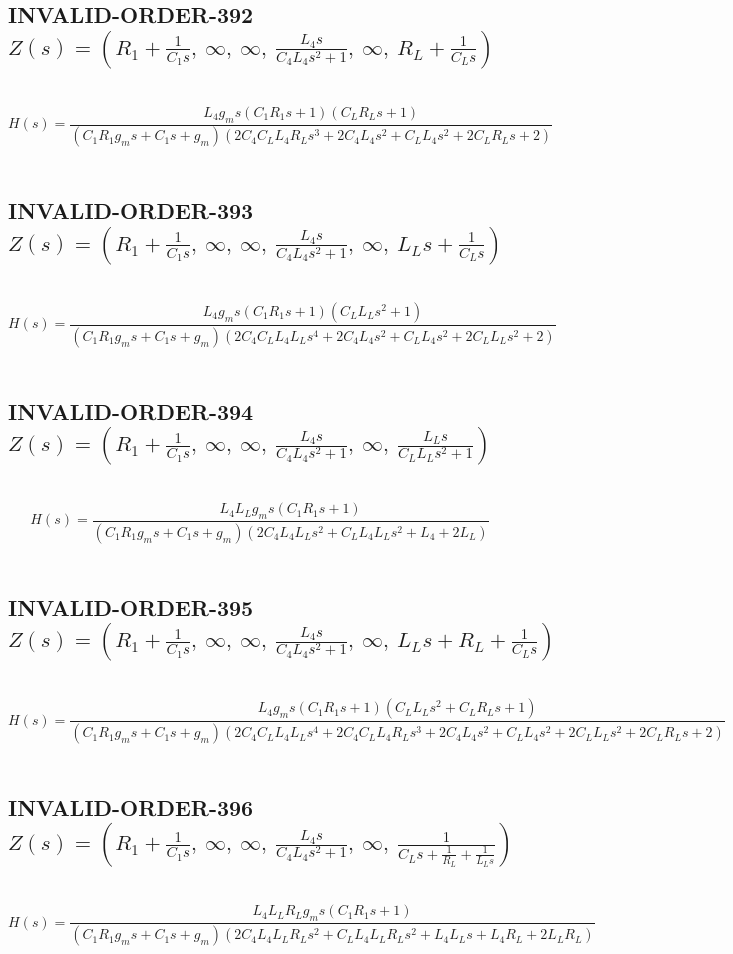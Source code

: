 \documentclass{article}
\begin{document}
\subsection{INVALID-ORDER-392 $Z(s) = \left( R_{1} + \frac{1}{C_{1} s}, \  \infty, \  \infty, \  \frac{L_{4} s}{C_{4} L_{4} s^{2} + 1}, \  \infty, \  R_{L} + \frac{1}{C_{L} s}\right)$ } \ 
\textbf{\[H(s) = \frac{L_{4} g_{m} s \left(C_{1} R_{1} s + 1\right) \left(C_{L} R_{L} s + 1\right)}{\left(C_{1} R_{1} g_{m} s + C_{1} s + g_{m}\right) \left(2 C_{4} C_{L} L_{4} R_{L} s^{3} + 2 C_{4} L_{4} s^{2} + C_{L} L_{4} s^{2} + 2 C_{L} R_{L} s + 2\right)}\] } \ 
\subsection{INVALID-ORDER-393 $Z(s) = \left( R_{1} + \frac{1}{C_{1} s}, \  \infty, \  \infty, \  \frac{L_{4} s}{C_{4} L_{4} s^{2} + 1}, \  \infty, \  L_{L} s + \frac{1}{C_{L} s}\right)$ } \ 
\textbf{\[H(s) = \frac{L_{4} g_{m} s \left(C_{1} R_{1} s + 1\right) \left(C_{L} L_{L} s^{2} + 1\right)}{\left(C_{1} R_{1} g_{m} s + C_{1} s + g_{m}\right) \left(2 C_{4} C_{L} L_{4} L_{L} s^{4} + 2 C_{4} L_{4} s^{2} + C_{L} L_{4} s^{2} + 2 C_{L} L_{L} s^{2} + 2\right)}\] } \ 
\subsection{INVALID-ORDER-394 $Z(s) = \left( R_{1} + \frac{1}{C_{1} s}, \  \infty, \  \infty, \  \frac{L_{4} s}{C_{4} L_{4} s^{2} + 1}, \  \infty, \  \frac{L_{L} s}{C_{L} L_{L} s^{2} + 1}\right)$ } \ 
\textbf{\[H(s) = \frac{L_{4} L_{L} g_{m} s \left(C_{1} R_{1} s + 1\right)}{\left(C_{1} R_{1} g_{m} s + C_{1} s + g_{m}\right) \left(2 C_{4} L_{4} L_{L} s^{2} + C_{L} L_{4} L_{L} s^{2} + L_{4} + 2 L_{L}\right)}\] } \ 
\subsection{INVALID-ORDER-395 $Z(s) = \left( R_{1} + \frac{1}{C_{1} s}, \  \infty, \  \infty, \  \frac{L_{4} s}{C_{4} L_{4} s^{2} + 1}, \  \infty, \  L_{L} s + R_{L} + \frac{1}{C_{L} s}\right)$ } \ 
\textbf{\[H(s) = \frac{L_{4} g_{m} s \left(C_{1} R_{1} s + 1\right) \left(C_{L} L_{L} s^{2} + C_{L} R_{L} s + 1\right)}{\left(C_{1} R_{1} g_{m} s + C_{1} s + g_{m}\right) \left(2 C_{4} C_{L} L_{4} L_{L} s^{4} + 2 C_{4} C_{L} L_{4} R_{L} s^{3} + 2 C_{4} L_{4} s^{2} + C_{L} L_{4} s^{2} + 2 C_{L} L_{L} s^{2} + 2 C_{L} R_{L} s + 2\right)}\] } \ 
\subsection{INVALID-ORDER-396 $Z(s) = \left( R_{1} + \frac{1}{C_{1} s}, \  \infty, \  \infty, \  \frac{L_{4} s}{C_{4} L_{4} s^{2} + 1}, \  \infty, \  \frac{1}{C_{L} s + \frac{1}{R_{L}} + \frac{1}{L_{L} s}}\right)$ } \ 
\textbf{\[H(s) = \frac{L_{4} L_{L} R_{L} g_{m} s \left(C_{1} R_{1} s + 1\right)}{\left(C_{1} R_{1} g_{m} s + C_{1} s + g_{m}\right) \left(2 C_{4} L_{4} L_{L} R_{L} s^{2} + C_{L} L_{4} L_{L} R_{L} s^{2} + L_{4} L_{L} s + L_{4} R_{L} + 2 L_{L} R_{L}\right)}\] } \ 
\end{document}
